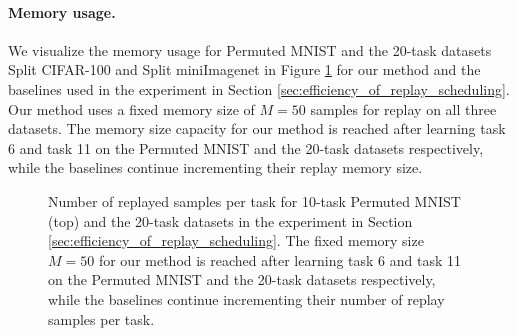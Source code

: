 \paragraph{Memory usage.} We visualize the memory usage for Permuted MNIST and the 20-task datasets Split CIFAR-100 and Split miniImagenet in Figure \ref{fig:memory_usage_10_and_20task_datasets} for our method and the baselines used in the experiment in Section \ref{sec:efficiency_of_replay_scheduling}. Our method uses a fixed memory size of $M=50$ samples for replay on all three datasets. The memory size capacity for our method is reached after learning task 6 and task 11 on the Permuted MNIST and the 20-task datasets respectively, while the baselines continue incrementing their replay memory size.

\begin{figure}[h]
  \centering
  \setlength{\figwidth}{0.78\textwidth}
  \setlength{\figheight}{.22\textheight}
  
  \caption{Number of replayed samples per task for 10-task Permuted MNIST (top) and the 20-task datasets in the experiment in Section \ref{sec:efficiency_of_replay_scheduling}. The fixed memory size $M=50$ for our method is reached after learning task 6 and task 11 on the Permuted MNIST and the 20-task datasets respectively, while the baselines continue incrementing their number of replay samples per task.}
  \label{fig:memory_usage_10_and_20task_datasets}
\end{figure}





